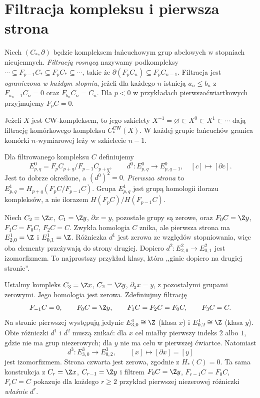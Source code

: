 \section{Filtracja kompleksu i pierwsza strona}
\begin{definicja}
Niech $(C_*,\partial)$ będzie kompleksem łańcuchowym grup abelowych
w stopniach nieujemnych. \emph{Filtracją rosnącą} nazywamy
podkompleksy
$\cdots\subseteq F_{p-1}C_*\subseteq F_pC_*\subseteq\cdots$,
takie że $\partial(F_pC_n)\subseteq F_pC_{n-1}$.
Filtracja jest \emph{ograniczona w każdym stopniu}, jeżeli
dla każdego $n$ istnieją $a_n\le b_n$ z
$F_{a_n-1}C_n=0$ oraz $F_{b_n}C_n=C_n$.
Dla $p<0$ w przykładach pierwszoćwiartkowych przyjmujemy $F_pC=0$.
\end{definicja}
\begin{przyklad}
Jeżeli $X$ jest CW-kompleksem, to jego szkielety
$X^{-1}=\varnothing\subset X^0\subset X^1\subset\cdots$
dają filtrację komórkowego kompleksu $C_*^{\mathrm{CW}}(X)$.
W każdej grupie łańcuchów granica komórki $n$-wymiarowej
leży w szkielecie $n-1$.
\end{przyklad}
\begin{definicja}
Dla filtrowanego kompleksu $C$ definiujemy
\[
E^0_{p,q}=F_pC_{p+q}/F_{p-1}C_{p+q},\qquad
 d^0:E^0_{p,q}\to E^0_{p,q-1},\quad [c]\mapsto[\partial c].
\]
Jest to dobrze określone, a $(d^0)^2=0$.
\emph{Pierwsza strona} to $E^1_{p,q}=H_{p+q}(F_pC/F_{p-1}C)$.
Grupa $E^1_{p,q}$ jest grupą homologii ilorazu kompleksów,
a nie ilorazem $H(F_pC)/H(F_{p-1}C)$.
\end{definicja}
\begin{przyklad}
Niech $C_2=\Z x$, $C_1=\Z y$, $\partial x=y$,
pozostałe grupy są zerowe, oraz $F_0C=\Z y$,
$F_1C=F_0C$, $F_2C=C$. Zwykła homologia $C$ znika,
ale pierwsza strona ma $E^1_{2,0}=\Z$ i $E^1_{0,1}=\Z$.
Różniczka $d^1$ jest zerowa ze względów stopniowania,
więc oba elementy przeżywają do strony drugiej.
Dopiero $d^2:E^2_{2,0}\to E^2_{0,1}$ jest izomorfizmem.
To najprostszy przykład klasy, która ,,ginie dopiero na drugiej stronie''.
\end{przyklad}

\begin{przyklad}
\label{prz:spectral-d3-cancel}
Ustalmy kompleks $C_3=\Z x$, $C_2=\Z y$,
$\partial_3x=y$, z pozostałymi grupami zerowymi.
Jego homologia jest zerowa.
Zdefiniujmy filtrację
\[
 F_{-1}C=0,\qquad F_0C=\Z y,\qquad
 F_1C=F_2C=F_0C,\qquad F_3C=C.
\]
Na stronie pierwszej występują jedynie
$E^1_{3,0}\cong\Z$ (klasa $x$)
i $E^1_{0,2}\cong\Z$ (klasa $y$).
Obie różniczki $d^1$ i $d^2$ muszą znikać:
dla $x$ cel miałby pierwszy indeks $2$ albo $1$,
gdzie nie ma grup niezerowych;
dla $y$ nie ma celu w pierwszej ćwiartce.
Natomiast
\[
 d^3:E^3_{3,0}\longrightarrow E^3_{0,2},
 \qquad [x]\longmapsto[\partial x]=[y]
\]
jest izomorfizmem. Strona czwarta jest zerowa,
zgodnie z $H_*(C)=0$.
Ta sama konstrukcja z $C_r=\Z x$,
$C_{r-1}=\Z y$ i filtrem
$F_0C=\Z y$, $F_{r-1}C=F_0C$, $F_rC=C$
pokazuje dla każdego $r\ge2$ przykład
pierwszej niezerowej różniczki \emph{właśnie} $d^r$.
\end{przyklad}

